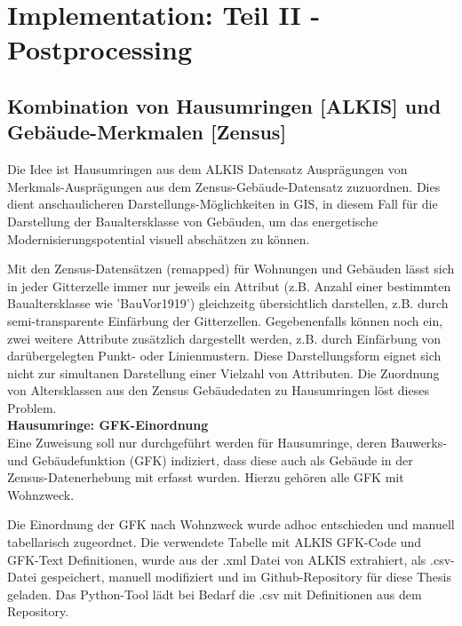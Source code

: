 			
	\section{Implementation: Teil II - Postprocessing}
	\label{sec:Code:Implementation2}
			
			
		\subsection{Kombination von Hausumringen [ALKIS] und \\Gebäude-Merkmalen [Zensus]}
		\label{sec:Code:Implementation2:HU_Alkis_Zensus_Merkmalszuweisung}
			Die Idee ist Hausumringen aus dem ALKIS Datensatz Ausprägungen von Merkmals-Ausprägungen aus dem Zensus-Gebäude-Datensatz zuzuordnen. Dies dient anschaulicheren Darstellungs-Möglichkeiten in GIS, in diesem Fall für die Darstellung der Baualtersklasse von Gebäuden, um das energetische Modernisierungspotential visuell abschätzen zu können.
					
			Mit den Zensus-Datensätzen (remapped) für Wohnungen und Gebäuden lässt sich in jeder Gitterzelle immer nur jeweils ein Attribut (z.B. Anzahl einer bestimmten Baualtersklasse wie 'BauVor1919') gleichzeitg übersichtlich darstellen, z.B. durch semi-transparente Einfärbung der Gitterzellen. Gegebenenfalls können noch ein, zwei weitere Attribute zusätzlich dargestellt werden, z.B. durch Einfärbung von darübergelegten Punkt- oder Linienmustern. Diese Darstellungsform eignet sich nicht zur simultanen Darstellung einer Vielzahl von Attributen. Die Zuordnung von Altersklassen aus den Zensus Gebäudedaten zu Hausumringen löst dieses Problem.\\

			\textbf{Hausumringe: GFK-Einordnung}\\
			Eine Zuweisung soll nur durchgeführt werden für Hausumringe, deren Bauwerks- und Gebäudefunktion (GFK) indiziert, dass diese auch als Gebäude in der Zensus-Datenerhebung mit erfasst wurden. Hierzu gehören alle GFK mit Wohnzweck.
			
			Die Einordnung der GFK nach Wohnzweck wurde adhoc entschieden und manuell tabellarisch zugeordnet. Die verwendete Tabelle mit ALKIS GFK-Code und GFK-Text Definitionen, wurde aus der .xml Datei von ALKIS extrahiert, als .csv-Datei gespeichert, manuell modifiziert und im Github-Repository für diese Thesis geladen. Das Python-Tool lädt bei Bedarf die .csv mit Definitionen aus dem Repository. \cite{web_github_repo_code} 
			
